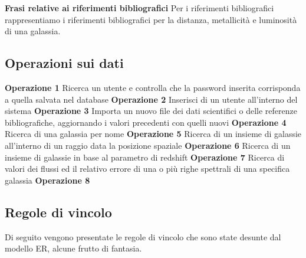 \documentclass[12pt,a4paper,onecolumn,x11names]{article}
\begin{document}
	\begin{framed}
		\begin{flushleft}
			\textbf{Frasi relative ai riferimenti bibliografici}\newline
			Per i riferimenti bibliografici rappresentiamo i riferimenti bibliografici per la distanza, metallicità e luminosità di una galassia.
		\end{flushleft}
	\end{framed}
	
	\subsection{Operazioni sui dati}
		\begin{flushleft}
			\textbf{Operazione 1} Ricerca un utente e controlla che la password inserita corrisponda a quella salvata nel database\newline\newline
			\textbf{Operazione 2} Inserisci di un utente all'interno del sistema\newline\newline
			\textbf{Operazione 3} Importa un nuovo file dei dati scientifici o delle referenze bibliografiche, aggiornando i valori precedenti con quelli nuovi\newline\newline
			\textbf{Operazione 4} Ricerca di una galassia per nome\newline\newline
			\textbf{Operazione 5} Ricerca di un insieme di galassie all'interno di un raggio data la posizione spaziale\newline\newline
			\textbf{Operazione 6} Ricerca di un insieme di galassie in base al parametro di redshift\newline\newline
			\textbf{Operazione 7} Ricerca di valori dei flussi ed il relativo errore di una o più righe spettrali di una specifica galassia\newline\newline
			\textbf{Operazione 8}
		\end{flushleft}
	
	\subsection{Regole di vincolo}
		Di seguito vengono presentate le regole di vincolo che sono state desunte dal modello ER, alcune frutto di fantasia.
		
\end{document}
